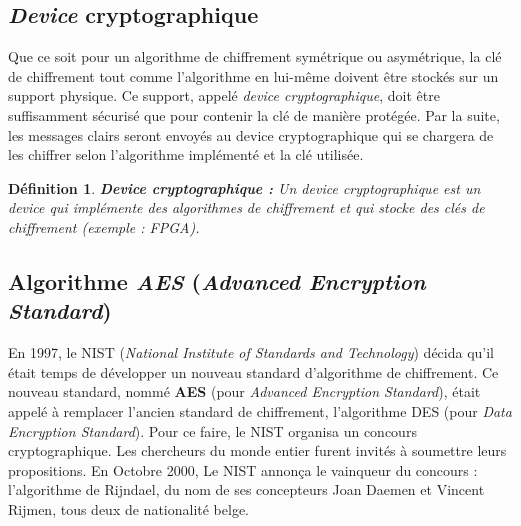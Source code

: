 \documentclass[oneside]{book}
\newtheorem{definition}{Définition}[section]
\begin{document}
\subsection{\textit{Device} cryptographique}
\label{sec:Introduction}

Que ce soit pour un algorithme de chiffrement symétrique ou asymétrique, la clé de chiffrement tout comme l'algorithme en lui-même doivent être stockés sur un support physique. Ce support, appelé \textit{device cryptographique}, doit être suffisamment sécurisé que pour contenir la clé de manière protégée. Par la suite, les messages clairs seront envoyés au device cryptographique qui se chargera de les chiffrer selon l'algorithme implémenté et la clé utilisée.

\theoremstyle{definition}
\begin{definition}{\textbf{Device cryptographique :}}
Un device cryptographique est un device qui implémente des algorithmes de chiffrement et qui stocke des clés de chiffrement (exemple : FPGA).
\end{definition}

\newpage

\subsection{Algorithme \textit{AES} (\textit{Advanced Encryption Standard})}
\label{subsec:AES}

En 1997, le NIST (\textit{National Institute of Standards and Technology}) décida qu'il était temps de développer un nouveau standard d'algorithme de chiffrement. Ce nouveau standard, nommé \textbf{AES} (pour \textit{Advanced Encryption Standard}), était appelé à remplacer l'ancien standard de chiffrement, l'algorithme DES (pour \textit{Data Encryption Standard}). Pour ce faire, le NIST organisa un concours cryptographique. Les chercheurs du monde entier furent invités à soumettre leurs propositions. En Octobre 2000, Le NIST annonça le vainqueur du concours : l'algorithme de Rijndael, du nom de ses concepteurs Joan Daemen et Vincent Rijmen, tous deux de nationalité belge.
\end{document}
